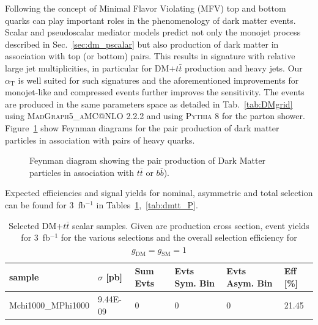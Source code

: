 Following the concept of Minimal Flavor Violating (MFV) top and bottom quarks can play important roles in the phenomenology of dark matter events.
Scalar and pseudoscalar mediator models predict not only the monojet process described in Sec.~\ref{sec:dm_pscalar} but also production of dark matter in association
with top (or bottom) pairs. This results in signature with relative large jet multiplicities, in particular for DM$+t\bar{t}$ production and heavy jets. Our $\alpha_{\textrm{T}}$ is well suited for such signatures and the aforementioned improvements for monojet-like and compressed events further improves the sensitivity. The events are produced in the same parameters space as detailed in Tab.~\ref{tab:DMgrid} using \textsc{MadGraph5\_aMC@NLO} 2.2.2 and using \textsc{Pythia 8} for the parton shower. Figure~\ref{fig:feynman_hf} show Feynman diagrams for the pair production of dark matter particles in association with pairs of heavy quarks.


\begin{figure}[h!]
  \centering
  \caption{Feynman diagram showing the pair production of Dark Matter particles in association with $t\bar{t}$ or $b\bar{b}$). \cite{Abercrombie:2015wmb}}
  \label{fig:feynman_hf}
\end{figure}


Expected efficiencies and signal yields for nominal, asymmetric and total selection can be found for 3~fb$^{-1}$ in Tables~\ref{tab:dmtt_S},~\ref{tab:dmtt_P}.

\begin{table}[h!]
\small
\centering
\begin{tabular}{l|lllll}
\hline
sample             & $\sigma$ [pb] & Sum Evts       & Evts Sym. Bin & Evts Asym. Bin & Eff  [\%]   \\\hline
Mchi1000\_MPhi1000 & 9.44E-09 & 0      & 0      & 0     & 21.45 \\
\hline
\end{tabular}
\caption{Selected DM+$t\bar{t}$ scalar samples. Given are production cross section, event yields for 3~fb$^{-1 }$ for the various selections and the overall selection efficiency for $g_\textrm{DM}=g_\textrm{SM}=1$ \label{tab:dmtt_S}}
\end{table}

